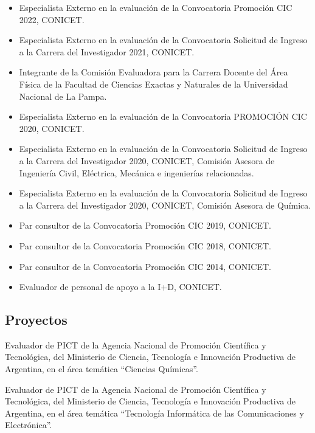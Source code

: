 \begin{itemize} \setlength\itemsep{-0.25em}
    \item {} Especialista Externo en la evaluación de la Convocatoria Promoción CIC 2022, CONICET.
    \item {} Especialista Externo en la evaluación de la Convocatoria Solicitud de Ingreso a la Carrera del Investigador 2021, CONICET.
    \item {} Integrante de la Comisión Evaluadora para la Carrera Docente del Área Física de la Facultad de Ciencias Exactas y Naturales de la Universidad Nacional de La Pampa.
    \item Especialista Externo en la evaluación de la Convocatoria PROMOCIÓN CIC 2020, CONICET.
    \item {} Especialista Externo en la evaluación de la Convocatoria Solicitud de Ingreso a la Carrera del Investigador 2020, CONICET, Comisión Asesora de Ingeniería Civil, Eléctrica, Mecánica e ingenierías relacionadas.
    \item Especialista Externo en la evaluación de la Convocatoria Solicitud de Ingreso a la Carrera del Investigador 2020, CONICET, Comisión Asesora de Química.
    \item {} Par consultor de la Convocatoria Promoción CIC 2019, CONICET.
    \item {} Par consultor de la Convocatoria Promoción CIC 2018, CONICET.
    \item {} Par consultor de la Convocatoria Promoción CIC 2014, CONICET.
    \item {} Evaluador de personal de apoyo a la I+D, CONICET.
\end{itemize}

\subsection{Proyectos}

 Evaluador de PICT de la Agencia Nacional de Promoción Científica y Tecnológica, del Ministerio de Ciencia, Tecnología e 
Innovación Productiva de Argentina, en el área temática ``Ciencias Químicas''.

 Evaluador de PICT de la Agencia Nacional de Promoción Científica y Tecnológica, del Ministerio de Ciencia, Tecnología e 
Innovación Productiva de Argentina, en el área temática ``Tecnología Informática de las Comunicaciones y Electrónica''.

